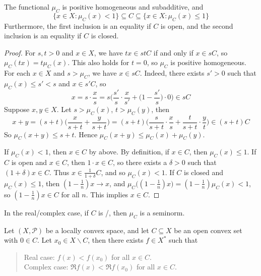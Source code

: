 \documentclass[a4paper]{article}
\begin{document}
\begin{nlemma}\label{lem:MinkowskiFunctional}
	The functional $\mu_C$ is positive homogeneous and subadditive, and
	\[
	 \{x\in X:\mu_C(x)<1\}\subseteq C\subseteq\{x\in X:\mu_C(x)\leq 1\}
	\]
	Furthermore, the first inclusion is an equality if $C$ is open, and the second inclusion is an equality if $C$ is closed.
\end{nlemma}

\begin{proof}
	For $s,t>0$ and $x\in X$, we have $tx\in stC$ if and only if $x\in sC$, so $\mu_C(tx)=t\mu_C(x)$. This also holds for $t=0$, so $\mu_C$ is positive homogeneous. For each $x\in X$ and $s>\mu_C$, we have $x\in sC$. Indeed, there exists $s'>0$ such that $\mu_C(x)\leq s'<s$ and $x\in s'C$, so
	\[
	 x=s\cdot\frac{x}{s}=s\bigg(\frac{s'}{s}\cdot\frac{x}{s'}+\Big(1-\frac{s'}{s}\Big)\cdot 0\bigg)\in sC
	\]
	Suppose $x,y\in X$. Let $s>\mu_C(x)$, $t>\mu_C(y)$, then
	\[
	 x+y=(s+t)\bigg(\frac{x}{s+t}+\frac{y}{s+t}\bigg)=(s+t)\bigg(\frac{s}{s+t}\cdot\frac{x}{s}+\frac{t}{s+t}\cdot\frac{y}{t}\bigg)\in (s+t)C
	\]
	So $\mu_C(x+y)\leq s+t$. Hence $\mu_C(x+y)\leq\mu_C(x)+\mu_C(y)$.

	If $\mu_C(x)<1$, then $x\in C$ by above. By definition, if $x\in C$, then $\mu_C(x)\leq 1$. If $C$ is open and $x\in C$, then $1\cdot x\in C$, so there exists a $\delta>0$ such that $(1+\delta)x\in C$. Thus $x\in\frac{1}{1+\delta}C$, and so $\mu_C(x)<1$. If $C$ is closed and $\mu_C(x)\leq 1$, then $(1-\frac{1}{n})x\to x$, and $\mu_C\big((1-\frac{1}{n})x\big)=(1-\frac{1}{n})\mu_C(x)<1$, so $(1-\frac{1}{n})x\in C$ for all $n$. This implies $x\in C$.
\end{proof}

\begin{remark}
  In the real/complex case, if $C$ is /, then $\mu_C$ is a seminorm.
\end{remark}

\begin{nthm}\label{thm:HBSep1}
	Let $(X,\mathcal{P})$ be a locally convex space, and let $C\subseteq X$ be an open convex set with $0\in C$. Let $x_0\in X\backslash C$, then there exists $f\in X^*$ such that
	\begin{quote}
  	Real case: $f(x)<f(x_0)$ for all $x\in C$.\\
	 Complex case: $\Re f(x)<\Re f(x_0)$ for all $x\in C$.
	\end{quote}
\end{nthm}
\end{document}
